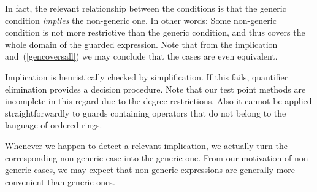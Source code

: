 In fact, the relevant relationship between the conditions is that the
generic condition {\em implies} the non-generic one. In other words:
Some non-generic condition is not more restrictive than the generic
condition, and thus covers the whole domain of the guarded expression.
Note that from the implication and~(\ref{gencoversall}) we may
conclude that the cases are even equivalent.

Implication is heuristically checked by simplification. If this fails,
quantifier elimination provides a decision procedure. Note that our
test point methods are incomplete in this regard due to the degree
restrictions. Also it cannot be applied straightforwardly to guards
containing operators that do not belong to the language of ordered
rings.

Whenever we happen to detect a relevant implication, we actually turn
the corresponding non-generic case into the generic one. From our
motivation of non-generic cases, we may expect that non-generic
expressions are generally more convenient than generic ones.
%
